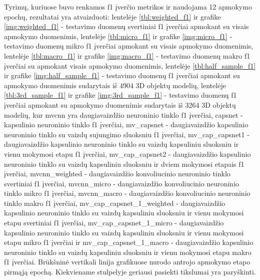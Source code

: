 Tyrimų, kuriuose buvo renkamos f1 įverčio metrikos ir naudojama 12 apmokymo epochų, rezultatai yra atvaizduoti: lentelėje \ref{tbl:weighted_f1} ir grafike \ref{img:weighted_f1} - testavimo duomenų svertiniai f1 įverčiai apmokant su visais apmokymo duomenimis, lentelėje \ref{tbl:micro_f1} ir grafike \ref{img:micro_f1} - testavimo duomenų mikro f1 įverčiai apmokant su visais apmokymo duomenimis, lentelėje \ref{tbl:macro_f1} ir grafike \ref{img:macro_f1} - testavimo duomenų makro f1 įverčiai su apmokant visais apmokymo duomenimis, lentelėje \ref{tbl:half_sample_f1} ir grafike \ref{img:half_sample_f1} - testavimo duomenų f1 įverčiai apmokant su apmokymo duomenimis sudarytais iš 4904 3D objektų modelių, lentelėje \ref{tbl:3rd_sample_f1} ir grafike \ref{img:3rd_sample_f1} - testavimo duomenų f1 įverčiai apmokant su apmokymo duomenimis sudarytais iš 3264 3D objektų modelių, kur
mvcnn yra daugiavaizdžio neuroninio tinklo f1 įverčiai, capsnet - kapsulinio neuroninio tinklo f1 įverčiai, mv\_capsnet - daugiavaizdžio kapsulinio neuroninio tinklo su vaizdų sujungimo sluoksniu f1 įverčiai, mv\_cap\_capsnet1 - daugiavaizdžio kapsulinio neuroninio tinklo su vaizdų kapsuliniu sluoksniu ir vienu mokymosi etapu f1 įverčiai, mv\_cap\_capsnet2 - daugiavaizdžio kapsulinio neuroninio tinklo su vaizdų kapsuliniu sluoksniu ir dviem mokymosi etapais f1 įverčiai, 
mvcnn\_weighted -  daugiavaizdžio konvoliucinio neuroninio tinklo svertiniai f1 įverčiai, 
mvcnn\_micro -  daugiavaizdžio konvoliucinio neuroninio tinklo mikro f1 įverčiai, 
mvcnn\_macro -  daugiavaizdžio konvoliucinio neuroninio tinklo makro f1 įverčiai, 
mv\_cap\_capsnet\_1\_weighted - daugiavaizdžio kapsulinio neuroninio tinklo su vaizdų kapsuliniu sluoksniu ir vienu mokymosi etapu svertiniai f1 įverčiai, 
mv\_cap\_capsnet\_1\_micro - daugiavaizdžio kapsulinio neuroninio tinklo su vaizdų kapsuliniu sluoksniu ir vienu mokymosi etapu mikro f1 įverčiai ir
mv\_cap\_capsnet\_1\_macro - daugiavaizdžio kapsulinio neuroninio tinklo su vaizdų kapsuliniu sluoksniu ir vienu mokymosi etapu makro f1 įverčiai. 
Brūkšninė vertikali linija grafikuose nurodo antrojo apmokymo etapo pirmąją epochą. Kiekviename stulpelyje geriausi pasiekti tikslumai yra paryškinti.

